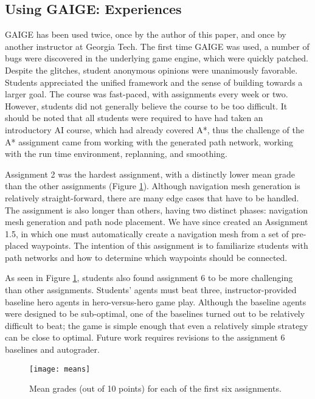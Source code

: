 \documentclass[letterpaper]{article}
\begin{document}
\subsection{Using GAIGE: Experiences}

GAIGE has been used twice, once by the author of this paper, and once by another instructor at Georgia Tech.
The first time GAIGE was used, a number of bugs were discovered in the underlying game engine, which were quickly patched.
Despite the glitches, student anonymous opinions were unanimously favorable.
Students appreciated the unified framework and the sense of building towards a larger goal. 
The course was fast-paced, with assignments every week or two.
However, students did not generally believe the course to be too difficult.
It should be noted that all students were required to have had taken an introductory AI course, which had already covered A*, thus the challenge of the A* assignment came from working with the generated path network, working with the run time environment, replanning, and smoothing.

Assignment 2 was the hardest assignment, with a distinctly lower mean grade than the other assignments (Figure \ref{fig:means}). 
Although navigation mesh generation is relatively straight-forward, there are many edge cases that have to be handled. 
The assignment is also longer than others, having two distinct phases: navigation mesh generation and path node placement.
We have since created an Assignment 1.5, in which one must automatically create a navigation mesh from a set of pre-placed waypoints. 
The intention of this assignment is to familiarize students with path networks and how to determine which waypoints should be connected.

As seen in Figure \ref{fig:means}, students also found assignment 6 to be more challenging than other assignments.
Students' agents must beat three, instructor-provided baseline hero agents in hero-versus-hero game play.
Although the baseline agents were designed to be sub-optimal, one of the baselines turned out to be relatively difficult to beat; the game is simple enough that even a relatively simple strategy can be close to optimal.
Future work requires revisions to the assignment 6 baselines and autograder. 

\begin{figure}
\centering
\texttt{[image: means]}
\caption{Mean grades (out of 10 points) for each of the first six assignments.}
\label{fig:means}
\end{figure}
\end{document}
